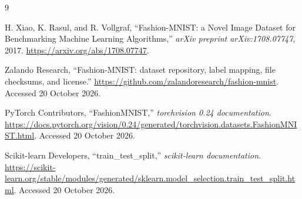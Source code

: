 {}
\begin{thebibliography}{9}
\raggedright
{}
H. Xiao, K. Rasul, and R. Vollgraf,
``Fashion-MNIST: a Novel Image Dataset for Benchmarking Machine Learning Algorithms,''
\emph{arXiv preprint arXiv:1708.07747}, 2017.
\url{https://arxiv.org/abs/1708.07747}.

Zalando Research, ``Fashion-MNIST: dataset repository, label mapping, file
checksums, and license.''
\url{https://github.com/zalandoresearch/fashion-mnist}.
Accessed 20 October 2026.

PyTorch Contributors, ``FashionMNIST,'' \emph{torchvision 0.24 documentation}.
\url{https://docs.pytorch.org/vision/0.24/generated/torchvision.datasets.FashionMNIST.html}.
Accessed 20 October 2026.

Scikit-learn Developers, ``train\_test\_split,'' \emph{scikit-learn documentation}.
\url{https://scikit-learn.org/stable/modules/generated/sklearn.model_selection.train_test_split.html}.
Accessed 20 October 2026.
\end{thebibliography}
